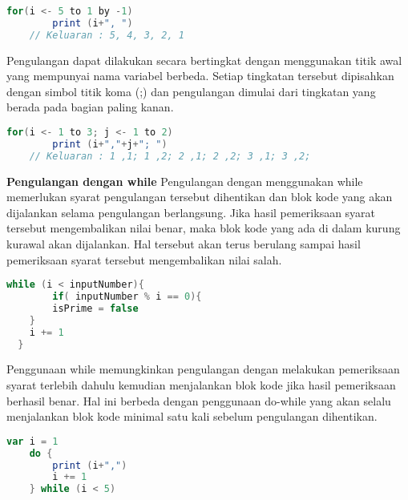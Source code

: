 \begin{lstlisting}[showstringspaces=false, language=Scala, caption= Pengulangan angka secara terurut menurun]
	for(i <- 5 to 1 by -1)
		print (i+", ")
	// Keluaran : 5, 4, 3, 2, 1
\end{lstlisting}

Pengulangan dapat dilakukan secara bertingkat dengan menggunakan titik awal yang mempunyai
nama variabel berbeda. Setiap tingkatan tersebut dipisahkan dengan simbol titik koma (;) dan
pengulangan dimulai dari tingkatan yang berada pada bagian paling kanan.

\begin{lstlisting}[showstringspaces=false, language=Scala, caption= Pengulangan bertingkat]
	for(i <- 1 to 3; j <- 1 to 2)
		print (i+","+j+"; ")
	// Keluaran : 1 ,1; 1 ,2; 2 ,1; 2 ,2; 3 ,1; 3 ,2;
\end{lstlisting}

\textbf{Pengulangan dengan while}\newline
Pengulangan dengan menggunakan while memerlukan syarat pengulangan tersebut dihentikan
dan blok kode yang akan dijalankan selama pengulangan berlangsung. Jika hasil pemeriksaan
syarat tersebut mengembalikan nilai benar, maka blok kode yang ada di dalam kurung kurawal
akan dijalankan. Hal tersebut akan terus berulang sampai hasil pemeriksaan syarat tersebut
mengembalikan nilai salah.

\begin{lstlisting}[showstringspaces=false, language=Scala, caption= Pengulangan menggunakan while]
	while (i < inputNumber){
		if( inputNumber % i == 0){
		isPrime = false
	}
	i += 1
  }
\end{lstlisting}

Penggunaan while memungkinkan pengulangan dengan melakukan pemeriksaan syarat terlebih
dahulu kemudian menjalankan blok kode jika hasil pemeriksaan berhasil benar. Hal ini berbeda
dengan penggunaan do-while yang akan selalu menjalankan blok kode minimal satu kali sebelum
pengulangan dihentikan.

\begin{lstlisting}[language=Scala, caption= Penggunaan do-while]
	var i = 1
	do {
		print (i+",")
		i += 1
	} while (i < 5)
\end{lstlisting}


